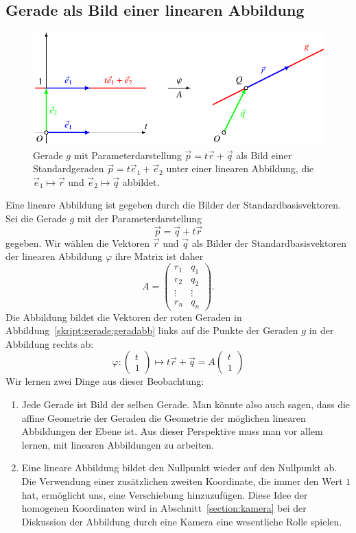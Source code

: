 \subsection{Gerade als Bild einer linearen Abbildung}
\begin{figure}
\centering
\includegraphics{3/images/geradeabb.pdf}
\caption{Gerade $g$ mit Parameterdarstellung $\vec{p} = t\vec{r}+\vec{q}$
als Bild einer Standardgeraden $\vec{p}=t\vec{e}_1+\vec{e}_2$ unter
einer linearen Abbildung, die $\vec{e}_1\mapsto\vec{r}$
und $\vec{e}_2\mapsto\vec{q}$ abbildet.
\label{skript:gerade:geradabb}}
\end{figure}
Eine lineare Abbildung ist gegeben durch die Bilder der
Standardbasisvektoren.
Sei die Gerade $g$ mit der Parameterdarstellung
\[
\vec{p}
=
\vec{q} + t\vec{r}
\]
gegeben.
Wir wählen die Vektoren $\vec{r}$ und $\vec{q}$ als Bilder der
Standardbasisvektoren der linearen Abbildung $\varphi$ ihre Matrix ist
daher 
\[
A=
\begin{pmatrix}
r_1   &q_1   \\
r_2   &q_2   \\
\vdots&\vdots\\
r_n   &q_n   
\end{pmatrix}.
\]
Die Abbildung bildet die Vektoren der roten Geraden in
Abbildung~\eqref{skript:gerade:geradabb} links auf die Punkte der
Geraden $g$ in der Abbildung rechts ab:
\[
\varphi
:
\begin{pmatrix}
t\\1
\end{pmatrix}
\mapsto
t\vec{r}
+
\vec{q}
=
A
\begin{pmatrix}
t\\1
\end{pmatrix}
\]
Wir lernen zwei Dinge aus dieser Beobachtung:
\begin{enumerate}
\item
Jede Gerade ist Bild der selben Gerade.
Man könnte also auch sagen, dass die affine Geometrie der Geraden
die Geometrie der möglichen linearen Abbildungen der Ebene ist.
Aus dieser Perspektive muss man vor allem lernen, mit linearen
Abbildungen zu arbeiten.
\item
Eine lineare Abbildung bildet den Nullpunkt wieder auf den Nullpunkt ab.
Die Verwendung einer zusätzlichen zweiten Koordinate, die immer den
Wert $1$ hat, ermöglicht uns, eine Verschiebung hinzuzufügen.
Diese Idee der homogenen Koordinaten wird in Abschnitt~\ref{section:kamera}
bei der Diskussion der Abbildung durch eine Kamera eine wesentliche Rolle
spielen.
\end{enumerate}


